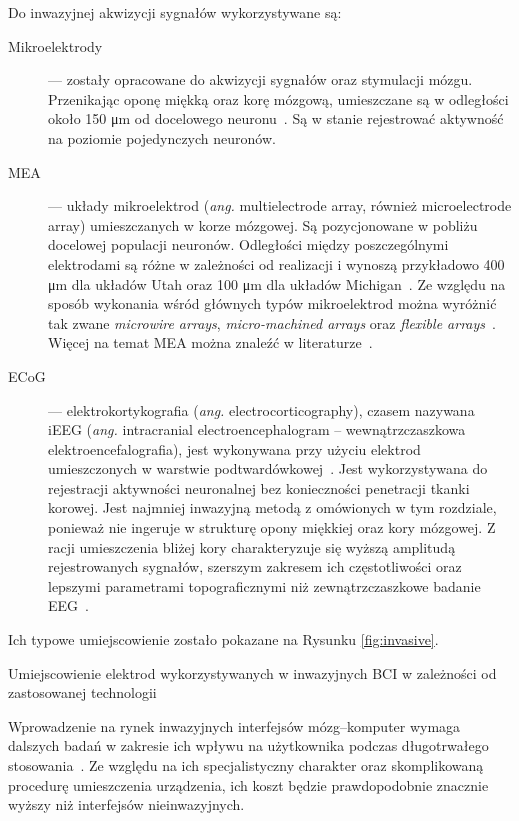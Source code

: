 \documentclass[skorowidz,skroty]{dyplomWEZUT}
\begin{document}
Do inwazyjnej akwizycji sygnałów wykorzystywane są:
\begin{description}
    \item [Mikroelektrody] --- zostały opracowane do akwizycji sygnałów oraz stymulacji mózgu. Przenikając oponę miękką oraz korę mózgową, umieszczane są w odległości około 150 μm od docelowego neuronu~\cite{bci_signals_invasive}. Są w stanie rejestrować aktywność na poziomie pojedynczych neuronów.
    \item [MEA] --- układy mikroelektrod (\textit{ang.} multielectrode array, również microelectrode array) umieszczanych w korze mózgowej. Są pozycjonowane w pobliżu docelowej populacji neuronów. Odległości między poszczególnymi elektrodami są różne w zależności od realizacji i wynoszą przykładowo 400 μm dla układów Utah oraz 100 μm dla układów Michigan~\cite{bci_mea}. Ze względu na sposób wykonania wśród głównych typów mikroelektrod można wyróżnić tak zwane \textit{microwire arrays}, \textit{micro-machined arrays} oraz \textit{flexible arrays}~\cite{bci_mea}. Więcej na temat MEA można znaleźć w literaturze~\cite{bci_signals_invasive,bci_mea,bci_principles}.
    \item [ECoG] --- elektrokortykografia (\textit{ang.} electrocorticography), czasem nazywana iEEG (\textit{ang.} intracranial electroencephalogram -- wewnątrzczaszkowa elektroencefalografia), jest wykonywana przy użyciu elektrod umieszczonych w warstwie podtwardówkowej~\cite{bci_signals_invasive}. Jest wykorzystywana do rejestracji aktywności neuronalnej bez konieczności penetracji tkanki korowej. Jest najmniej inwazyjną metodą z omówionych w tym rozdziale, ponieważ nie ingeruje w strukturę opony miękkiej oraz kory mózgowej. Z racji umieszczenia bliżej kory charakteryzuje się wyższą amplitudą rejestrowanych sygnałów, szerszym zakresem ich częstotliwości oraz lepszymi parametrami topograficznymi niż zewnątrzczaszkowe badanie EEG~\cite{bci_revolutionizing}.
\end{description}
Ich typowe umiejscowienie zostało pokazane na Rysunku \vref{fig:invasive}.

{Umiejscowienie elektrod wykorzystywanych w inwazyjnych BCI w zależności od zastosowanej technologii\label{fig:invasive}}
{\cite{bci_signals_invasive}}

Wprowadzenie na rynek inwazyjnych interfejsów mózg--komputer wymaga dalszych badań w zakresie ich wpływu na użytkownika podczas długotrwałego stosowania~\cite{bci_revolutionizing}. Ze względu na ich specjalistyczny charakter oraz skomplikowaną procedurę umieszczenia urządzenia, ich koszt będzie prawdopodobnie znacznie wyższy niż interfejsów nieinwazyjnych. 
\end{document}
